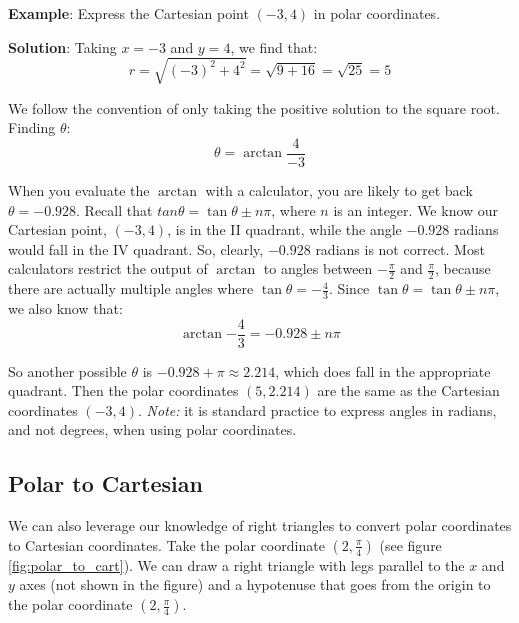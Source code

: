 \textbf{Example}: Express the Cartesian point $(-3, 4)$ in polar coordinates. 

\textbf{Solution}: Taking $x = -3$ and $y = 4$, we find that:
$$r = \sqrt{(-3)^2 + 4^2} = \sqrt{9 + 16} = \sqrt{25} = 5$$

We follow the convention of only taking the positive solution to the square 
root. Finding $\theta$:
$$\theta = \arctan{\frac{4}{-3}}$$

When you evaluate the $\arctan$ with a calculator, you are likely to get back 
$\theta = -0.928$. Recall that $tan{\theta} = \tan{\theta \pm n\pi}$, where $n$ 
is an integer. We know our Cartesian point, $(-3, 4)$, is in the II quadrant, 
while the angle $-0.928$ radians would fall in the IV quadrant. So, clearly, 
$-0.928$ radians is not correct. Most calculators restrict the output of 
$\arctan$ to angles between $-\frac{\pi}{2}$ and $\frac{\pi}{2}$, because 
there are actually multiple angles where $\tan{\theta} = -\frac{4}{3}$. Since 
$\tan{\theta} = \tan{\theta \pm n \pi}$, we also know that:
$$\arctan{-\frac{4}{3}} = -0.928 \pm n \pi$$

So another possible $\theta$ is $-0.928 + \pi \approx 2.214$, which does fall 
in the appropriate quadrant. Then the polar coordinates $(5, 2.214)$ are the 
same as the Cartesian coordinates $(-3, 4)$. \textit{Note:} it is standard 
practice to express angles in radians, and not degrees, when using polar 
coordinates. 

\subsection{Polar to Cartesian}
We can also leverage our knowledge of right triangles to convert polar 
coordinates to Cartesian coordinates. Take the polar coordinate $(2, 
\frac{\pi}{4})$ (see figure \ref{fig:polar_to_cart}). We can draw a right 
triangle with legs parallel to the $x$ and $y$ axes (not shown in the figure) 
and a hypotenuse that goes from the origin to the polar coordinate $(2, \frac{
\pi}{4})$. 

